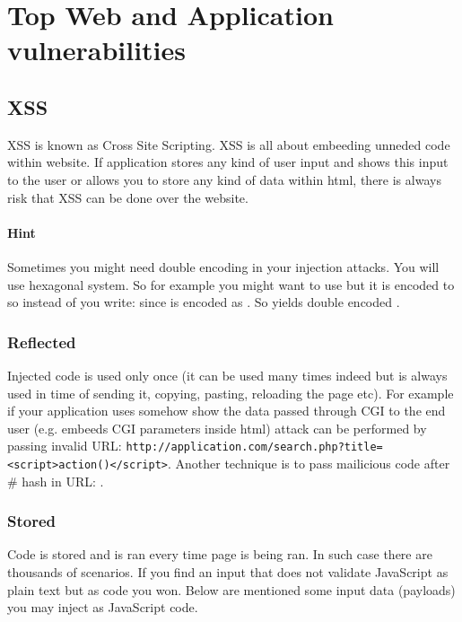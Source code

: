 
\section{Top Web and Application vulnerabilities}


\subsection{XSS} XSS is known as Cross Site Scripting.
XSS is all about embeeding unneded code within website.
If application stores any kind of user input and shows this input to the user or allows you to store any kind of data within html, there is always risk that XSS can be done over the website.

\paragraph{Hint} Sometimes you might need double encoding in your injection attacks.
You will use hexagonal system.
So for example you might want to use \q{\textbackslash} but it is encoded to  so instead of \q{\textbackslash} you write:  since \q{\%} is encoded as .
So  yields double encoded \q{\textbackslash}.
\subsubsection{Reflected} Injected code is used only once (it can be used many times indeed but is always used in time of sending it, copying, pasting, reloading the page etc).
For example if your application uses somehow show the data passed through CGI to the end user (e.g. embeeds CGI parameters inside html) attack can be performed by passing invalid URL: \texttt{http://application.com/search.php?title=<script>action()</script>}.
Another technique is to pass mailicious code after \# hash in URL: \texttt{}.
\subsubsection{Stored}  Code is stored and is ran every time page is being ran.
In such case there are thousands of scenarios.
If you find an input that does not validate JavaScript as plain text but as code you won.
Below are mentioned some input data (payloads) you may inject as JavaScript code.\newline

